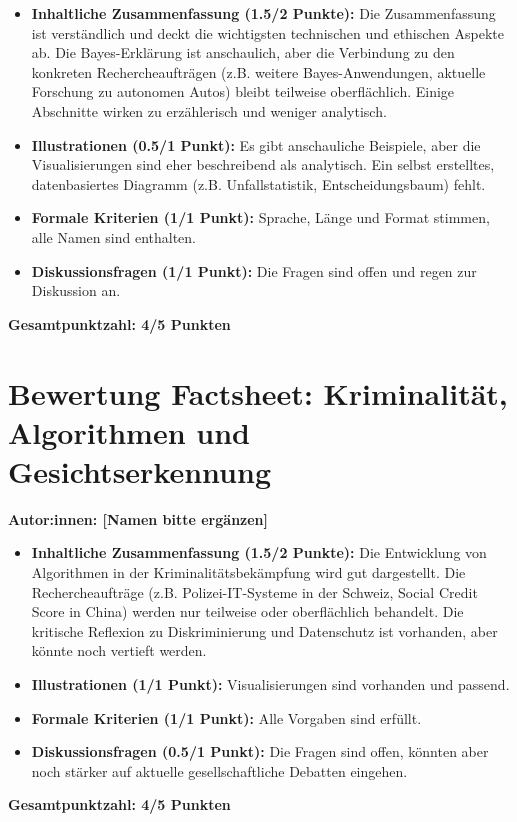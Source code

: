 \begin{itemize}
    \item \textbf{Inhaltliche Zusammenfassung (1.5/2 Punkte):} Die Zusammenfassung ist verständlich und deckt die wichtigsten technischen und ethischen Aspekte ab. Die Bayes-Erklärung ist anschaulich, aber die Verbindung zu den konkreten Rechercheaufträgen (z.B. weitere Bayes-Anwendungen, aktuelle Forschung zu autonomen Autos) bleibt teilweise oberflächlich. Einige Abschnitte wirken zu erzählerisch und weniger analytisch.
    \item \textbf{Illustrationen (0.5/1 Punkt):} Es gibt anschauliche Beispiele, aber die Visualisierungen sind eher beschreibend als analytisch. Ein selbst erstelltes, datenbasiertes Diagramm (z.B. Unfallstatistik, Entscheidungsbaum) fehlt.
    \item \textbf{Formale Kriterien (1/1 Punkt):} Sprache, Länge und Format stimmen, alle Namen sind enthalten.
    \item \textbf{Diskussionsfragen (1/1 Punkt):} Die Fragen sind offen und regen zur Diskussion an.
\end{itemize}

\textbf{Gesamtpunktzahl: 4/5 Punkten}

\newpage


\section*{Bewertung Factsheet: Kriminalität, Algorithmen und Gesichtserkennung}

\textbf{Autor:innen: [Namen bitte ergänzen]}

\begin{itemize}
    \item \textbf{Inhaltliche Zusammenfassung (1.5/2 Punkte):} Die Entwicklung von Algorithmen in der Kriminalitätsbekämpfung wird gut dargestellt. Die Rechercheaufträge (z.B. Polizei-IT-Systeme in der Schweiz, Social Credit Score in China) werden nur teilweise oder oberflächlich behandelt. Die kritische Reflexion zu Diskriminierung und Datenschutz ist vorhanden, aber könnte noch vertieft werden.
    \item \textbf{Illustrationen (1/1 Punkt):} Visualisierungen sind vorhanden und passend.
    \item \textbf{Formale Kriterien (1/1 Punkt):} Alle Vorgaben sind erfüllt.
    \item \textbf{Diskussionsfragen (0.5/1 Punkt):} Die Fragen sind offen, könnten aber noch stärker auf aktuelle gesellschaftliche Debatten eingehen.
\end{itemize}

\textbf{Gesamtpunktzahl: 4/5 Punkten}

\newpage

